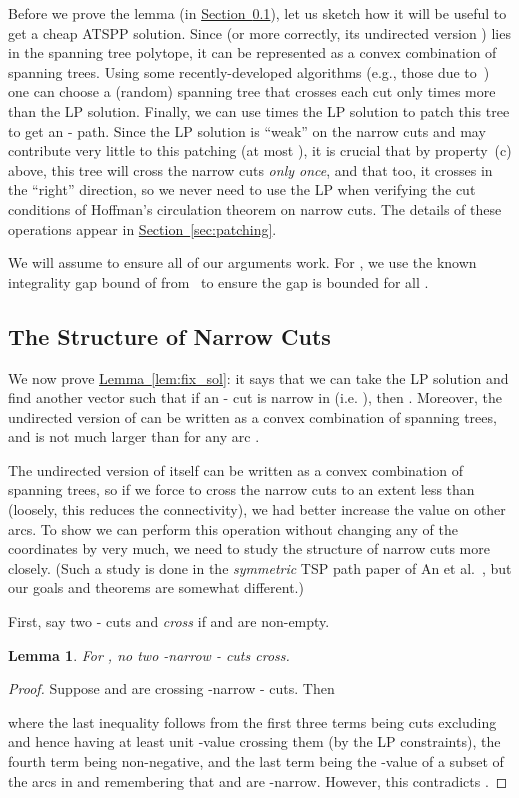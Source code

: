 \documentclass[11pt]{article}
\newcommand{\lref}[2][]{\hyperref[#2]{#1~\ref*{#2}}}
\newtheorem{lemma}[theorem]{Lemma}
\theoremstyle{definition}
\begin{document}
Before we prove the lemma (in \lref[Section]{sec:proof-of-lem}), let us
sketch how it will be useful to get a cheap ATSPP solution. Since  (or more
correctly, its undirected version ) lies in the spanning tree
polytope, it can be represented as a convex combination of spanning
trees.  Using some recently-developed algorithms (e.g., those due
to~\cite{AGMSS,CVZ10}) one can choose a (random) spanning tree that crosses
each cut only  times more than the LP solution. Finally, we can
use  times the LP solution to patch this tree to get an -
path. Since the LP solution is ``weak'' on the narrow cuts and may
contribute very little to this patching (at most ), it is crucial
that by property~(c) above, this tree will cross the narrow cuts
\emph{only once}, and that too, it crosses in the ``right'' direction,
so we never need to use the LP when verifying the cut conditions of
Hoffman's circulation theorem on narrow cuts. The details of these
operations appear in \lref[Section]{sec:patching}.

We will assume  to ensure all of our arguments work. For ,
we use the known integrality gap bound of 
from~\cite{FSS10} to ensure the gap is bounded for all .

\subsection{The Structure of Narrow Cuts}
\label{sec:proof-of-lem}

We now prove \lref[Lemma]{lem:fix_sol}: it says that we can take the LP
solution  and find another vector  such that if an - cut is
narrow in  (i.e. ), then . Moreover,
the undirected version of  can be written as a convex combination of
spanning trees, and  is not much larger than  for any arc .

The undirected version of  itself can be written as a
convex combination of spanning trees, so if we force  to cross the
narrow cuts to an extent less than  (loosely, this reduces the
connectivity), we had better increase the value on other arcs. To show we
can perform this operation without changing any of the coordinates by
very much, we need to study the structure of narrow cuts more closely.
(Such a study is done in the \emph{symmetric} TSP path paper of An et
al.~\cite{AKS12}, but our goals and theorems are somewhat different.)

First, say two - cuts  and  \emph{cross} if 
and  are
non-empty. 

\begin{lemma}
  \label{lem:nocross}
  For , no two -narrow - cuts cross.
\end{lemma}
\begin{proof}
  Suppose  and  are crossing -narrow - cuts. Then
  
  where the last inequality follows from the first three terms being
  cuts excluding  and hence having at least unit -value crossing them (by the
  LP constraints), the fourth term being non-negative, and the last term
  being the -value of a subset of the arcs in  and remembering that  and  are -narrow.
  However, this contradicts .
\end{proof}
\end{document}
